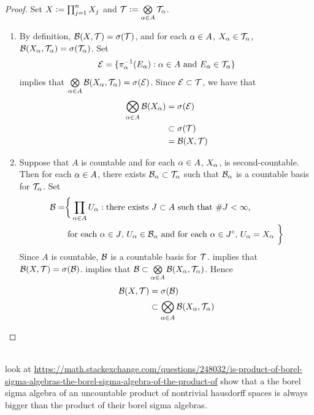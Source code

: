 \documentclass{book}
\begin{document}
 	\begin{proof} Set $X \vcentcolon= \prod_{j=1}^n X_j$ and $\mathcal{T} \vcentcolon= \bigotimes\limits_{\alpha \in A} \mathcal{T}_{\alpha}$.
 		\begin{enumerate}
 			\item By definition, $\mathcal{B}(X, \mathcal{T}) = \sigma(\mathcal{T})$, and for each $\alpha \in A$, $X_{\alpha} \in \mathcal{T}_{\alpha}$, $\mathcal{B}(X_{\alpha}, \mathcal{T}_{\alpha}) = \sigma(\mathcal{T}_{\alpha})$. Set 
 			$$\mathcal{E} = \{\pi^{-1}_{\alpha}(E_{\alpha}): \alpha \in A \text{ and } E_{\alpha} \in \mathcal{T}_{\alpha} \}$$ 
 			 implies that $\bigotimes\limits_{\alpha \in A} \mathcal{B}(X_{\alpha}, \mathcal{T}_{\alpha}) = \sigma(\mathcal{E})$. Since $\mathcal{E} \subset \mathcal{T}$, we have that
 			\begin{align*}
 				\bigotimes_{\alpha \in A} \mathcal{B}(X_{\alpha}) 
 				& = \sigma(\mathcal{E}) \\
 				& \subset \sigma(\mathcal{T}) \\
 				& = \mathcal{B}(X, \mathcal{T})
 			\end{align*}
 			\item Suppose that $A$ is countable and for each $\alpha \in A$, $X_{\alpha}$, is second-countable. Then for each $\alpha \in A$, there exists $\mathcal{B}_{\alpha} \subset \mathcal{T}_{\alpha}$ such that $\mathcal{B}_{\alpha}$ is a countable basis for $\mathcal{T}_{\alpha}$. Set 
 			\begin{align*}
 				\mathcal{B} = 
 				& \bigg \{\prod_{\alpha \in A} U_{\alpha}: \text{there exists $J \subset A$ such that $ \# J < \infty$, } \\
 				& \text{ for each $\alpha \in J$, $U_{\alpha} \in \mathcal{B}_{\alpha}$ and for each $\alpha \in J^c$, $U_{\alpha} = X_{\alpha}$ } \bigg \}
 			\end{align*} 
 			Since $A$ is countable, $\mathcal{B}$ is a countable basis for $\mathcal{T}$.  implies that $\mathcal{B}(X, \mathcal{T}) = \sigma(\mathcal{B})$.  implies that $\mathcal{B} \subset \bigotimes\limits_{\alpha \in A} \mathcal{B}(X_{\alpha}, \mathcal{T}_{\alpha})$. Hence
 			\begin{align*}
 				\mathcal{B}(X, \mathcal{T}) 
 				& = \sigma(\mathcal{B}) \\
 				& \subset \bigotimes_{\alpha \in A} \mathcal{B}(X_{\alpha}, \mathcal{T}_{\alpha}) 
 			\end{align*}
 		\end{enumerate}
 	\end{proof}
 	
 	
	\tcb{\#\#\#\#\#\#\#\#\#\#\#\#\#\#\#\#\#\#\#\#\#\#\#\#\#\#\#\#\#\#\#\#\#\#\#\#}
	\\
	 look at \href{https://math.stackexchange.com/questions/248032/is-product-of-borel-sigma-algebras-the-borel-sigma-algebra-of-the-product-of}{https://math.stackexchange.com/questions/248032/is-product-of-borel-sigma-algebras-the-borel-sigma-algebra-of-the-product-of} show that a the borel sigma algebra of an uncountable product of nontrivial hausdorff spaces is always bigger than the product of their borel sigma algebras. \\
	\tcr{\#\#\#\#\#\#\#\#\#\#\#\#\#\#\#\#\#\#\#\#\#\#\#\#\#\#\#\#\#\#\#\#\#\#\#\#}
	 	
\end{document}
